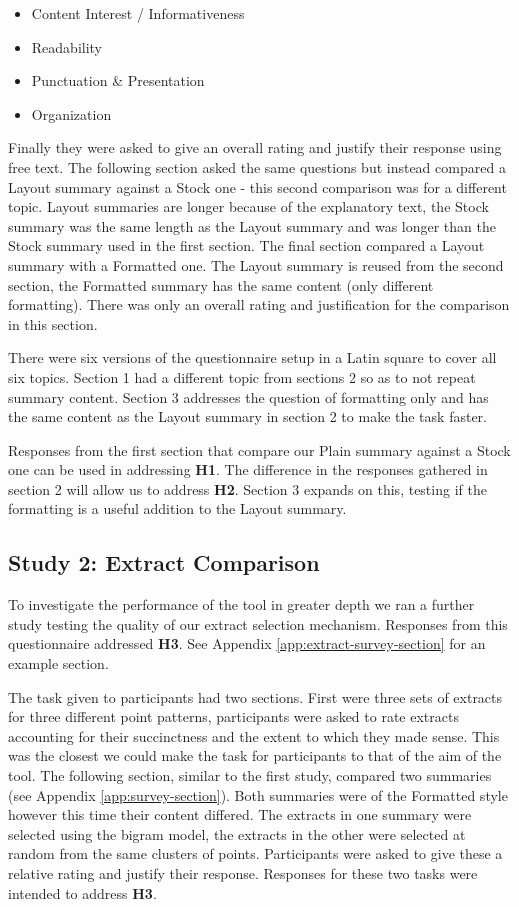       \begin{itemize}
        \item{Content Interest / Informativeness}
        \item{Readability}
        \item{Punctuation \& Presentation}
        \item{Organization}
      \end{itemize}

      Finally they were asked to give an overall rating and justify their response using free text. The following section asked the same questions but instead compared a Layout summary against a Stock one - this second comparison was for a different topic. Layout summaries are longer because of the explanatory text, the Stock summary was the same length as the Layout summary and was longer than the Stock summary used in the first section. The final section compared a Layout summary with a Formatted one. The Layout summary is reused from the second section, the Formatted summary has the same content (only different formatting). There was only an overall rating and justification for the comparison in this section.

      There were six versions of the questionnaire setup in a Latin square to cover all six topics. Section 1 had a different topic from sections 2 so as to not repeat summary content. Section 3 addresses the question of formatting only and has the same content as the Layout summary in section 2 to make the task faster.

      Responses from the first section that compare our Plain summary against a Stock one can be used in addressing \textbf{H1}. The difference in the responses gathered in section 2 will allow us to address \textbf{H2}. Section 3 expands on this, testing if the formatting is a useful addition to the Layout summary.

    \tocless\subsection{Study 2: Extract Comparison}
    To investigate the performance of the tool in greater depth we ran a further study testing the quality of our extract selection mechanism. Responses from this questionnaire addressed \textbf{H3}. See Appendix \ref{app:extract-survey-section} for an example section.

    The task given to participants had two sections. First were three sets of extracts for three different point patterns, participants were asked to rate extracts accounting for their succinctness and the extent to which they made sense. This was the closest we could make the task for participants to that of the aim of the tool. The following section, similar to the first study, compared two summaries (see Appendix \ref{app:survey-section}). Both summaries were of the Formatted style however this time their content differed. The extracts in one summary were selected using the bigram model, the extracts in the other were selected at random from the same clusters of points. Participants were asked to give these a relative rating and justify their response. Responses for these two tasks were intended to address \textbf{H3}.


